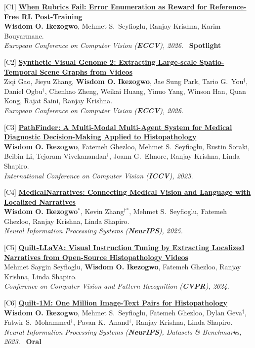 \documentclass[10pt,letterpaper]{article}
\newcommand{\cvsub}[1]{\vspace{1.5mm}{\scshape\bfseries #1}\par\vspace{0.5mm}}
\newcommand{\ptitle}[2]{{\bfseries\color{linkc}\href{#1}{#2}}}
\newcommand{\me}{\textbf{Wisdom O. Ikezogwo}}
\newcommand{\mt}[1]{#1$^\dagger$}   %
\newcommand{\venue}[1]{\textit{#1}}
\newcommand{\oral}{{\color{oralred}\faAward~\textbf{Oral}}}
\newcommand{\spotlight}{{\color{oralred}\faAward~\textbf{Spotlight}}}
\begin{document}
\cvsub{Conference Papers}
\begin{pubs}
  \item[{[C1]}] \ptitle{https://arxiv.org/abs/2603.05659}{When Rubrics Fail: Error Enumeration as Reward for Reference-Free RL Post-Training}\\
  \me, Mehmet S.\ Seyfioglu, Ranjay Krishna, Karim Bouyarmane.\\
  \venue{European Conference on Computer Vision (\textbf{ECCV}), 2026.} \spotlight
  \item[{[C2]}] \ptitle{https://arxiv.org/abs/2602.23543}{Synthetic Visual Genome 2: Extracting Large-scale Spatio-Temporal Scene Graphs from Videos}\\
  Ziqi Gao, Jieyu Zhang, \me, Jae Sung Park, \mt{Tario G.\ You}, \mt{Daniel Ogbu}, Chenhao Zheng, Weikai Huang, Yinuo Yang, Winson Han, Quan Kong, Rajat Saini, Ranjay Krishna.\\
  \venue{European Conference on Computer Vision (\textbf{ECCV}), 2026.}
  \item[{[C3]}] \ptitle{https://arxiv.org/abs/2502.08916}{PathFinder: A Multi-Modal Multi-Agent System for Medical Diagnostic Decision-Making Applied to Histopathology}\\
  \me, Fatemeh Ghezloo, Mehmet S.\ Seyfioglu, Rustin Soraki, Beibin Li, \mt{Tejoram Vivekanandan}, Joann G.\ Elmore, Ranjay Krishna, Linda Shapiro.\\
  \venue{International Conference on Computer Vision (\textbf{ICCV}), 2025.}
  \item[{[C4]}] \ptitle{https://arxiv.org/abs/2501.04184}{MedicalNarratives: Connecting Medical Vision and Language with Localized Narratives}\\
  \me$^*$, \mt{Kevin Zhang}$^*$, Mehmet S.\ Seyfioglu, Fatemeh Ghezloo, Ranjay Krishna, Linda Shapiro.\\
  \venue{Neural Information Processing Systems (\textbf{NeurIPS}), 2025.}
  \item[{[C5]}] \ptitle{https://openaccess.thecvf.com/content/CVPR2024/papers/Seyfioglu_Quilt-LLaVA_Visual_Instruction_Tuning_by_Extracting_Localized_Narratives_from_Open-Source_CVPR_2024_paper.pdf}{Quilt-LLaVA: Visual Instruction Tuning by Extracting Localized Narratives from Open-Source Histopathology Videos}\\
  Mehmet Saygin Seyfioglu, \me, Fatemeh Ghezloo, Ranjay Krishna, Linda Shapiro.\\
  \venue{Conference on Computer Vision and Pattern Recognition (\textbf{CVPR}), 2024.}
  \item[{[C6]}] \ptitle{https://arxiv.org/abs/2306.11207}{Quilt-1M: One Million Image-Text Pairs for Histopathology}\\
  \me, Mehmet S.\ Seyfioglu, Fatemeh Ghezloo, \mt{Dylan Geva}, \mt{Fatwir S.\ Mohammed}, \mt{Pavan K.\ Anand}, Ranjay Krishna, Linda Shapiro.\\
  \venue{Neural Information Processing Systems (\textbf{NeurIPS}), Datasets \& Benchmarks, 2023.} \oral
\end{pubs}
\end{document}
